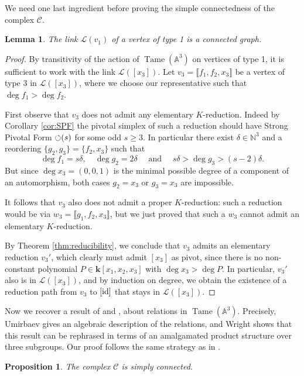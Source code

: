 \documentclass[reqno,oneside,11pt]{amsart}
\theoremstyle{plain}
\newtheorem{proposition}[theorem]{Proposition}
\newtheorem{lemma}[theorem]{Lemma}
\theoremstyle{definition}
\newcommand{\N}{\mathbb{N}}
\newcommand{\A}{{\mathbb{A}}}
\newcommand{\K}{\mathbf{k}}
\renewcommand{\LL}{\mathcal{L}}
\DeclareMathOperator{\Tame}{Tame}
\newcommand{\PF}{\text{$\circlearrowleft$\!\,}}
\newcommand{\Comp}{\mathcal{C}}
\newcommand{\id}{\text{\rm id}}
\newcommand{\TA}{\Tame(\A^3)}
\newcommand{\llb}{\llbracket}
\newcommand{\rrb}{\rrbracket}
\renewcommand{\ge}{\geqslant}
\begin{document}
We need one last ingredient before proving the simple connectedness of the complex $\Comp$.

\begin{lemma} \label{lem:link1connected}
The link $\LL(v_1)$ of a vertex of type 1 is a connected graph.
\end{lemma}

\begin{proof}
By transitivity of the action of $\TA$ on vertices of type 1, it is sufficient
to work with the link $\LL([x_3])$.
Let $v_3 = \llb f_1, f_2, x_3 \rrb$ be a vertex of type 3 in $\LL([x_3])$,
where we choose our representative such that $\deg f_1 > \deg f_2$.

First observe that $v_3$ does not admit any elementary $K$-reduction.
Indeed by Corollary \ref{cor:SPF} the pivotal simplex of such a reduction should have Strong Pivotal Form $\PF(s)$ for some odd $s \ge 3$.
In particular there exist $\delta \in \N^3$ and a reordering $\{g_2, g_3\} = \{f_2, x_3\}$ such that
$$\deg f_1 = s\delta, \quad \deg g_2 = 2\delta \quad \text{ and } \quad s\delta > \deg g_3 > (s-2)\delta.$$ 
But since $\deg x_3 = (0,0,1)$ is the minimal possible degree of a component of an automorphism, both cases $g_2 = x_3$ or $g_3 = x_3$ are impossible.

It follows that $v_3$ also does not admit a proper $K$-reduction: such a reduction would be via $w_3 = \llb g_1, f_2, x_3 \rrb$, but we just proved that such a $w_3$ cannot admit an elementary $K$-reduction.

By Theorem \ref{thm:reducibility}, we conclude that $v_3$ admits an elementary
reduction $v_3'$, which clearly must admit $[x_3]$ as pivot, since there is no non-constant
polynomial $P \in \K[x_1,x_2,x_3]$ with $\deg x_3 > \deg P$.
In particular, $v_3'$ also is in $\LL([x_3])$, and by induction on degree, we obtain the existence of a reduction path from $v_3$ to $[\id]$ that stays in $\LL([x_3])$.
\end{proof}

Now we recover a result of \cite{U} and \cite{wright}, about relations in $\Tame(\A^3)$.
Precisely, Umirbaev gives an algebraic description of the relations, and Wright shows that this result can be rephrased in terms of an amalgamated product structure over three subgroups.
Our proof follows the same strategy as in \cite[Proposition 3.10]{BFL}.

\begin{proposition}\label{pro:1connected}
The complex $\Comp$ is simply connected.
\end{proposition}
\end{document}
